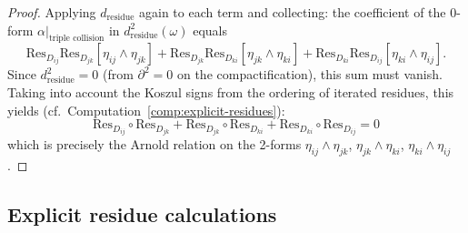 \begin{proof}
Applying $d_{\text{residue}}$ again to each term and collecting: the coefficient of the
$0$-form $\alpha|_{\text{triple collision}}$ in $d_{\text{residue}}^2(\omega)$ equals
\[\text{Res}_{D_{ij}} \text{Res}_{D_{jk}}[\eta_{ij} \wedge \eta_{jk}]
+ \text{Res}_{D_{jk}} \text{Res}_{D_{ki}}[\eta_{jk} \wedge \eta_{ki}]
+ \text{Res}_{D_{ki}} \text{Res}_{D_{ij}}[\eta_{ki} \wedge \eta_{ij}].\]
Since $d_{\text{residue}}^2 = 0$ (from $\partial^2 = 0$ on the compactification), this
sum must vanish.  Taking into account the Koszul signs from the ordering of iterated
residues, this yields (cf.\ Computation~\ref{comp:explicit-residues}):
\[\text{Res}_{D_{ij}} \circ \text{Res}_{D_{jk}} + \text{Res}_{D_{jk}} \circ
\text{Res}_{D_{ki}} + \text{Res}_{D_{ki}} \circ \text{Res}_{D_{ij}} = 0\]
which is precisely the Arnold relation on the 2-forms
$\eta_{ij} \wedge \eta_{jk}$, $\eta_{jk} \wedge \eta_{ki}$,
$\eta_{ki} \wedge \eta_{ij}$.
\end{proof}

\subsection{Explicit residue calculations}

